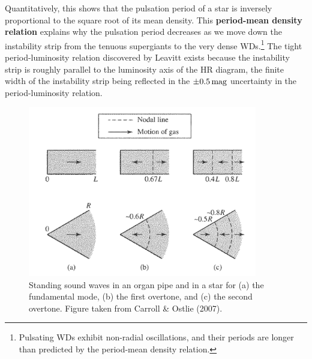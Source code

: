 \documentclass[a4paper,10pt]{article}
\begin{document}
{\noindent}Quantitatively, this shows that the pulsation period of a star is inversely proportional to the square root of its mean density. This \textbf{period-mean density relation} explains why the pulsation period decreases as we move down the instability strip from the tenuous supergiants to the very dense WDs.\footnote{Pulsating WDs exhibit non-radial oscillations, and their periods are longer than predicted by the period-mean density relation.} The tight period-luminosity relation discovered by Leavitt exists because the instability strip is roughly parallel to the luminosity axis of the HR diagram, the finite width of the instability strip being reflected in the $\pm0.5\,{\rm mag}$ uncertainty in the period-luminosity relation. 

\begin{figure}[b!]
    \centering
    \includegraphics[width=10cm]{figures/StellarOvertones.png}
    \caption{\footnotesize{Standing sound waves in an organ pipe and in a star for (a) the fundamental mode, (b) the first overtone, and (c) the second overtone. Figure taken from Carroll \& Ostlie (2007).}}
    \label{fig:stellarovertones}
\end{figure}
\end{document}
